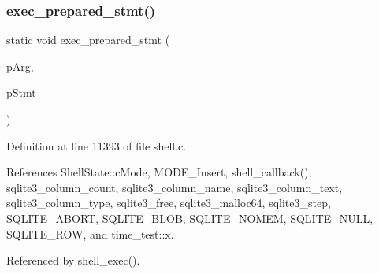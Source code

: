 \subsubsection{exec\+\_\+prepared\+\_\+stmt()}
{\footnotesize\ttfamily static void exec\+\_\+prepared\+\_\+stmt (\begin{DoxyParamCaption}\item[{\textbf{ Shell\+State} $\ast$}]{p\+Arg,  }\item[{\textbf{ sqlite3\+\_\+stmt} $\ast$}]{p\+Stmt }\end{DoxyParamCaption})\hspace{0.3cm}{\ttfamily [static]}}



Definition at line 11393 of file shell.\+c.



References Shell\+State\+::c\+Mode, M\+O\+D\+E\+\_\+\+Insert, shell\+\_\+callback(), sqlite3\+\_\+column\+\_\+count, sqlite3\+\_\+column\+\_\+name, sqlite3\+\_\+column\+\_\+text, sqlite3\+\_\+column\+\_\+type, sqlite3\+\_\+free, sqlite3\+\_\+malloc64, sqlite3\+\_\+step, S\+Q\+L\+I\+T\+E\+\_\+\+A\+B\+O\+RT, S\+Q\+L\+I\+T\+E\+\_\+\+B\+L\+OB, S\+Q\+L\+I\+T\+E\+\_\+\+N\+O\+M\+EM, S\+Q\+L\+I\+T\+E\+\_\+\+N\+U\+LL, S\+Q\+L\+I\+T\+E\+\_\+\+R\+OW, and time\+\_\+test\+::x.



Referenced by shell\+\_\+exec().


